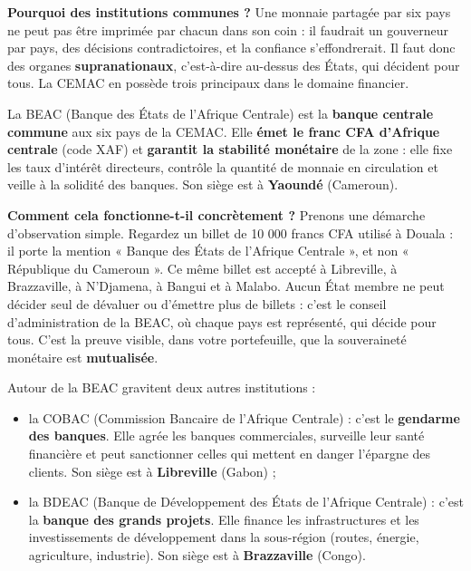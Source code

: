 \documentclass[11pt]{article}
\newcommand{\cle}[1]{{\popxbold\color{popdark}#1}}
\begin{document}
\textbf{Pourquoi des institutions communes ?} Une monnaie partagée par six pays ne peut pas être imprimée par chacun dans son coin : il faudrait un gouverneur par pays, des décisions contradictoires, et la confiance s'effondrerait. Il faut donc des organes \textbf{supranationaux}, c'est-à-dire au-dessus des États, qui décident pour tous. La CEMAC en possède trois principaux dans le domaine financier.

\begin{definition}[La BEAC]
La \cle{BEAC} (Banque des États de l'Afrique Centrale) est la \textbf{banque centrale commune} aux six pays de la CEMAC. Elle \textbf{émet le franc CFA d'Afrique centrale} (code XAF) et \textbf{garantit la stabilité monétaire} de la zone : elle fixe les taux d'intérêt directeurs, contrôle la quantité de monnaie en circulation et veille à la solidité des banques. Son siège est à \textbf{Yaoundé} (Cameroun).
\end{definition}

\textbf{Comment cela fonctionne-t-il concrètement ?} Prenons une démarche d'observation simple. Regardez un billet de 10 000 francs CFA utilisé à Douala : il porte la mention « Banque des États de l'Afrique Centrale », et non « République du Cameroun ». Ce même billet est accepté à Libreville, à Brazzaville, à N'Djamena, à Bangui et à Malabo. Aucun État membre ne peut décider seul de dévaluer ou d'émettre plus de billets : c'est le conseil d'administration de la BEAC, où chaque pays est représenté, qui décide pour tous. C'est la preuve visible, dans votre portefeuille, que la souveraineté monétaire est \textbf{mutualisée}.

Autour de la BEAC gravitent deux autres institutions :
\begin{itemize}
\item la \cle{COBAC} (Commission Bancaire de l'Afrique Centrale) : c'est le \textbf{gendarme des banques}. Elle agrée les banques commerciales, surveille leur santé financière et peut sanctionner celles qui mettent en danger l'épargne des clients. Son siège est à \textbf{Libreville} (Gabon) ;
\item la \cle{BDEAC} (Banque de Développement des États de l'Afrique Centrale) : c'est la \textbf{banque des grands projets}. Elle finance les infrastructures et les investissements de développement dans la sous-région (routes, énergie, agriculture, industrie). Son siège est à \textbf{Brazzaville} (Congo).
\end{itemize}
\end{document}
